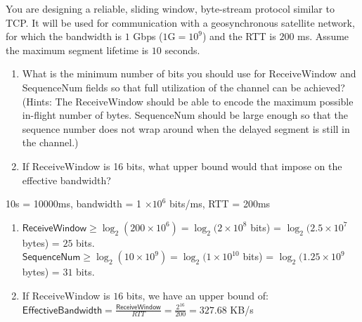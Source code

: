 \documentclass{report}
\begin{document}
\newpage
\begin{problem}
You are designing a reliable, sliding window, byte-stream protocol similar to TCP.
It will be used for communication with a geosynchronous satellite network, for which the bandwidth is $1$ Gbps ($1\textrm{G}=10^9$) and the RTT is $200$ ms. Assume the maximum segment lifetime is $10$ seconds.

\begin{enumerate}
\item What is the minimum number of bits you should use for \textsf{ReceiveWindow} and \textsf{SequenceNum} fields so that full utilization of the channel can be achieved? (Hints: The \textsf{ReceiveWindow} should be able to encode the maximum possible in-flight number of bytes. \textsf{SequenceNum} should be large enough so that the sequence number does not wrap around when the delayed segment is still in the channel.)
\item If \textsf{ReceiveWindow} is 16 bits, what upper bound would that impose on the effective bandwidth?

\end{enumerate}

\medskip

\begin{answer}{45em}
    10s = 10000ms,
    bandwidth = 1 $\times 10^6$ bits/ms, 
    RTT = 200ms
    \begin{enumerate}
        \item
            $\textsf{ReceiveWindow} \geq \log_{2}(200 \times 10^6) = \log_{2}(2 \times 10^8$ bits) = $\log_{2}(2.5 \times 10^7$ bytes) = $25$ bits. \\
            $\textsf{SequenceNum} \geq \log_{2}(10 \times 10^{9}) = \log_{2}(1 \times 10^{10}$ bits) = $\log_{2}(1.25 \times 10^9$ bytes) = $31$ bits.
        \item If \textsf{ReceiveWindow} is $16$ bits, we have an upper bound of: \\
            $\textsf{EffectiveBandwidth} = \frac{\textsf{ReceiveWindow}}{RTT} = \frac{2^{16}}{200} = 327.68$ KB/s
    \end{enumerate}
\end{answer}
\end{problem}
\end{document}
